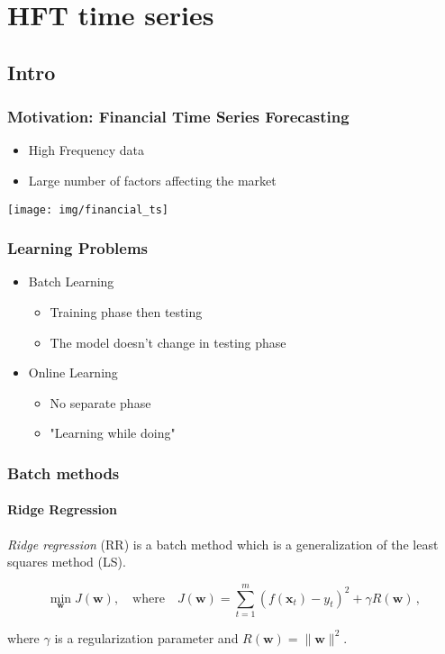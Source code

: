
\section{HFT time series}
\subsection{Intro}

\begin{frame}
    \frametitle{Motivation: Financial Time Series Forecasting}
    \begin{itemize}
        \item High Frequency data
        \item Large number of factors affecting the market
    \end{itemize}
    \begin{center}
    \texttt{[image: img/financial\_ts]}
    \end{center}
\end{frame}


\begin{frame}
    \frametitle{Learning Problems}
    \begin{itemize}
        \item Batch Learning
        \begin{itemize}
            \item Training phase then testing
            \item The model doesn't change in testing phase
        \end{itemize}
        \item Online Learning
        \begin{itemize}
            \item No separate phase
            \item "Learning while doing"
        \end{itemize}
    \end{itemize}
\end{frame}


\begin{frame}
    \frametitle{Batch methods}
    \framesubtitle{Ridge Regression}

    \begin{Definition}
    {\em Ridge regression} (RR) is a batch method which is a
        generalization of the least squares method (LS). 
    \end{Definition}

    \begin{equation*} \min_{\mathbf{w}} J(\mathbf{w}), \quad
    \text{where} \quad J(\mathbf{w}) = \sum_{t=1}^m
    (f(\mathbf{x}_t)-y_t)^2  + \gamma R(\mathbf{w}) \, ,
    \end{equation*} 
    
    where $\gamma$ is a regularization parameter and
    $R(\mathbf{w}) = \| \mathbf{w}\| ^2$.
\end{frame}



